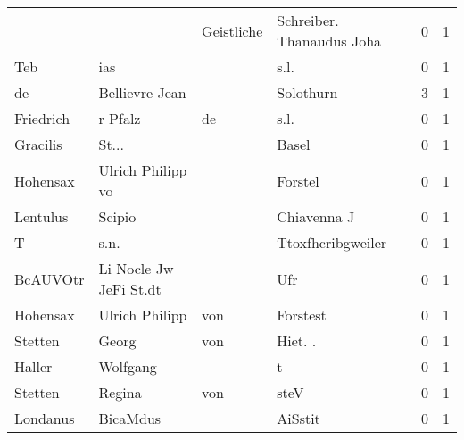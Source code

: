 \begin{center}
\begin{tiny}
\begin{longtabu}{llllrr}
                          &                                    &  Geistliche &                   Schreiber. Thanaudus Joha &          0 &         1 \\
                      Teb &                                ias &             &                                        s.l. &          0 &         1 \\
                       de &                     Bellievre Jean &             &                                   Solothurn &          3 &         1 \\
                Friedrich &                            r Pfalz &          de &                                        s.l. &          0 &         1 \\
                 Gracilis &                              St... &             &                                       Basel &          0 &         1 \\
                 Hohensax &                  Ulrich Philipp vo &             &                                     Forstel &          0 &         1 \\
                 Lentulus &                             Scipio &             &                                 Chiavenna J &          0 &         1 \\
                        T &                               s.n. &             &                           Ttoxfhcribgweiler &          0 &         1 \\
                 BcAUVOtr &             Li Nocle Jw JeFi St.dt &             &                                         Ufr &          0 &         1 \\
                 Hohensax &                     Ulrich Philipp &         von &                                    Forstest &          0 &         1 \\
                  Stetten &                              Georg &         von &                                    Hiet. .  &          0 &         1 \\
                   Haller &                           Wolfgang &             &                                           t &          0 &         1 \\
                  Stetten &                             Regina &         von &                                        steV &          0 &         1 \\
                 Londanus &                           BicaMdus &             &                                     AiSstit &          0 &         1 \\

\end{longtabu}
\end{tiny}
\end{center}

